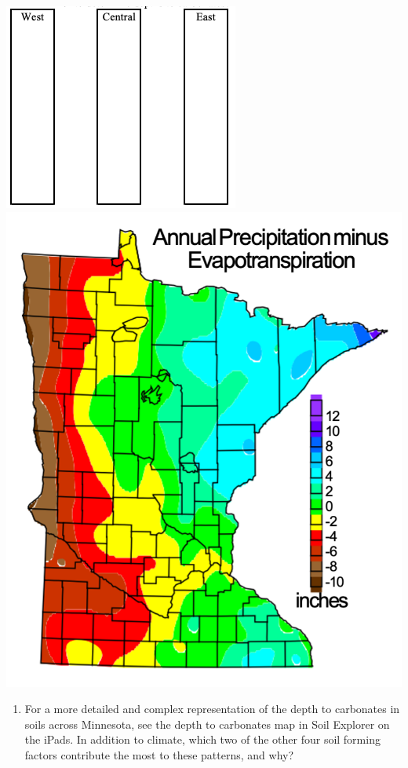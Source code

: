 \documentclass[
  letterpaper,
  twocolumn,
  portrait]{scrbook}
\providecommand{\tightlist}{%
  \setlength{\itemsep}{0pt}\setlength{\parskip}{0pt}}\usepackage{longtable,booktabs,array}
\begin{document}
\includegraphics{depth-to-carbonates.png}
\includegraphics{mn-precip-evap.png}

\begin{enumerate}
\def\labelenumi{\arabic{enumi}.}
\setcounter{enumi}{1}
\tightlist
\item
  For a more detailed and complex representation of the depth to
  carbonates in soils across Minnesota, see the depth to carbonates map
  in Soil Explorer on the iPads. In addition to climate, which two of
  the other four soil forming factors contribute the most to these
  patterns, and why?
\end{enumerate}
\end{document}
